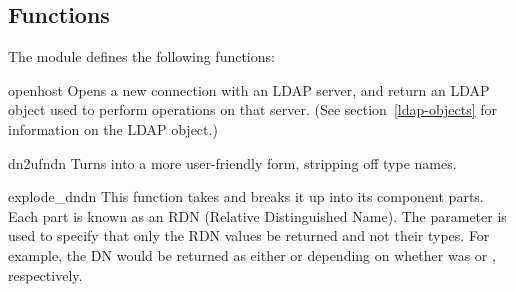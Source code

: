 \subsection{Functions}

The  module defines the following functions:


\begin{funcdesc}{open}{host } %
  Opens a new connection with an LDAP server, and return an LDAP object
  used to perform operations on that server.
  (See section~\ref{ldap-objects} for information on the LDAP object.)
\end{funcdesc}

\begin{funcdesc}{dn2ufn}{dn} %
  Turns  into a more user-friendly form, stripping off type names.
  \begin{seealso}
  \end{seealso}
\end{funcdesc}

\begin{funcdesc}{explode_dn}{dn } %
  This function takes  and breaks it up into its component parts. 
  Each part is known as an RDN (Relative Distinguished Name). The
   parameter is used to specify that only the RDN values be 
  returned and not their types.
  For example, the DN  would be
  returned as either \code{["cn=Bob", "c=US"]} or \code{["Bob","US"]}
  depending on whether  was  or ,
  respectively.
\end{funcdesc}

